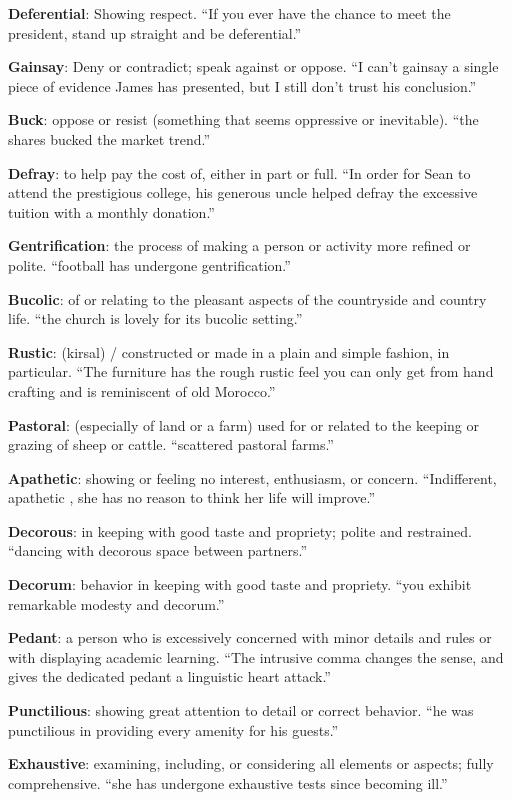 \documentclass[12pt, a4paper]{ximera}
\begin{document}
\textbf{Deferential}: Showing respect. ``If you ever have the chance to meet the president, stand up straight and be deferential.''

\textbf{Gainsay}: Deny or contradict; speak against or oppose. ``I can't gainsay a single piece of evidence James has presented, but I still don't trust his conclusion.''

\textbf{Buck}: oppose or resist (something that seems oppressive or inevitable). ``the shares bucked the market trend.''

\textbf{Defray}: to help pay the cost of, either in part or full. ``In order for Sean to attend the prestigious college, his generous uncle helped defray the excessive tuition with a monthly donation.''

\textbf{Gentrification}:  the process of making a person or activity more refined or polite. ``football has undergone gentrification.''

\textbf{Bucolic}: of or relating to the pleasant aspects of the countryside and country life. ``the church is lovely for its bucolic setting.''

\textbf{Rustic}: (kirsal) / constructed or made in a plain and simple fashion, in particular. ``The furniture has the rough rustic feel you can only get from hand crafting and is reminiscent of old Morocco.'' 

\textbf{Pastoral}: (especially of land or a farm) used for or related to the keeping or grazing of sheep or cattle. ``scattered pastoral farms.''

\textbf{Apathetic}: showing or feeling no interest, enthusiasm, or concern. ``Indifferent, apathetic , she has no reason to think her life will improve.''

\textbf{Decorous}: in keeping with good taste and propriety; polite and restrained. ``dancing with decorous space between partners.''

\textbf{Decorum}: behavior in keeping with good taste and propriety. ``you exhibit remarkable modesty and decorum.''

\textbf{Pedant}: a person who is excessively concerned with minor details and rules or with displaying academic learning. ``The intrusive comma changes the sense, and gives the dedicated pedant a linguistic heart attack.''

\textbf{Punctilious}: showing great attention to detail or correct behavior. ``he was punctilious in providing every amenity for his guests.''

\textbf{Exhaustive}: examining, including, or considering all elements or aspects; fully comprehensive. ``she has undergone exhaustive tests since becoming ill.''
\end{document}
